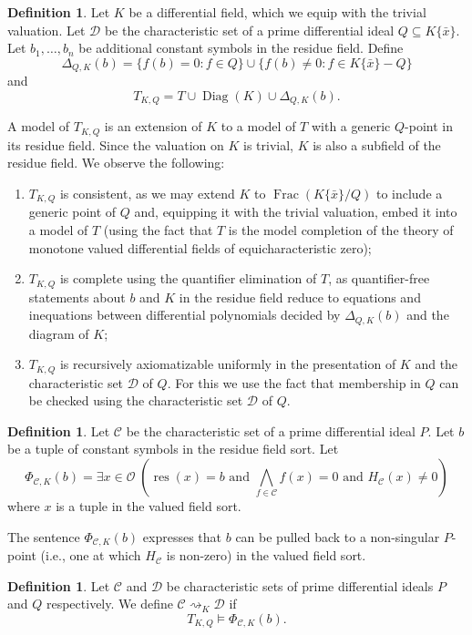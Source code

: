 \documentclass[12pt]{amsart}
\theoremstyle{definition}
\newtheorem{definition}[theorem]{Definition}
\numberwithin{subcase}{cases}
\theoremstyle{remark}
\DeclareMathOperator{\res}{res}
\newcommand{\mc}[1]{\mathcal{#1}}
\DeclareMathOperator{\Frac}{Frac}
\begin{document}
\begin{definition}
    Let $K$ be a differential field, which we equip with the trivial valuation. Let $\mc{D}$ be the characteristic set of a prime differential ideal $Q \subseteq K\{\bar{x}\}$. Let $b_1,\ldots,b_n$ be additional constant symbols in the residue field. Define
    \[ \Delta_{Q,K}(b)
 =\{f(b)=0:f\in Q\}
   \cup\{f(b)\ne0:f\in K\{\bar{x}\} - Q\} \]
   and
   \[
   T_{K,Q}
 =T\cup\operatorname{Diag}(K)\cup\Delta_{Q,K}(b).\]
\end{definition}
A model of $T_{K,Q}$ is an extension of $K$ to a model of $T$ with a generic $Q$-point in its residue field. Since the valuation on $K$ is trivial, $K$ is also a subfield of the residue field. We observe the following:
\begin{enumerate}
    \item $T_{K,Q}$ is consistent, as we may extend $K$ to $\Frac(K\{\bar{x}\}/Q)$ to include a generic point of $Q$ and, equipping it with the trivial valuation, embed it into a model of $T$ (using the fact that $T$ is the model completion of the theory of monotone valued differential fields of equicharacteristic zero);
    \item $T_{K,Q}$ is complete using the quantifier elimination of $T$, as quantifier-free statements about $b$ and $K$ in the residue field reduce to equations and inequations between differential polynomials decided by $\Delta_{Q,K}(b)$ and the diagram of $K$;
    \item $T_{K,Q}$ is recursively axiomatizable uniformly in the presentation of $K$ and the characteristic set $\mc{D}$ of $Q$. For this we use the fact that membership in $Q$ can be checked using the characteristic set $\mc{D}$ of $Q$.
\end{enumerate}

\begin{definition}
    Let $\mc{C}$ be the characteristic set of a prime differential ideal $P$. Let $b$ be a tuple of constant symbols in the residue field sort. Let
    \[ \Phi_{\mc{C},K}(b) = \exists x \in \mc{O} \; (\res(x) = b \text{ and } \bigwedge_{f \in \mc{C}} f(x) = 0\text{ and } H_{\mc{C}}(x) \neq 0)\]
    where $x$ is a tuple in the valued field sort.
\end{definition}

The sentence $\Phi_{\mc{C},K}(b)$ expresses that $b$ can be pulled back to a non-singular $P$-point (i.e., one at which $H_{\mc{C}}$ is non-zero) in the valued field sort.

\begin{definition}
    Let $\mc{C}$ and $\mc{D}$ be characteristic sets of prime differential ideals $P$ and $Q$ respectively. We define
$\mathcal C\rightsquigarrow_K\mathcal D$ if
\[
 T_{K,Q}\models\Phi_{\mathcal C,K}(b).
\]
\end{definition}
\end{document}
